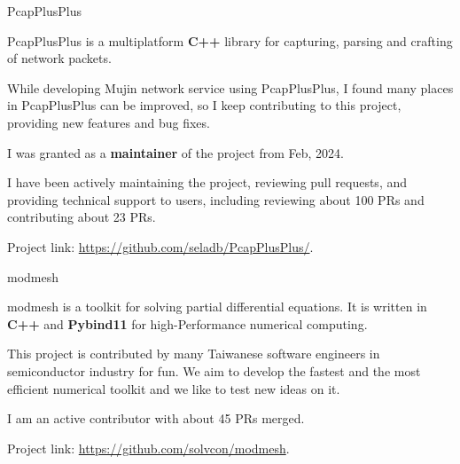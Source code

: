 
\vspace{-2mm}

\begin{cventries}

  \cventry
    {} %
    {PcapPlusPlus} %
    {} %
    {} %
    {
      \vspace{-2mm}
      \begin{cvitems} %
        \item {PcapPlusPlus is a multiplatform \textbf{C++} library for capturing, parsing and crafting of network packets.}
        \item {While developing Mujin network service using PcapPlusPlus, I found many places in PcapPlusPlus can be improved,
        so I keep contributing to this project, providing new features and bug fixes.}
        \item {I was granted as a \textbf{maintainer} of the project from Feb, 2024.}
        \item {I have been actively maintaining the project, reviewing pull requests, and providing technical support to users, including reviewing about 100 PRs and contributing about 23 PRs.}
        \item {Project link: \url{https://github.com/seladb/PcapPlusPlus/}.}
      \end{cvitems}
    }
  \vspace{-2mm}

  \cventry
    {} %
    {modmesh} %
    {} %
    {} %
    {
      \vspace{-2mm}
      \begin{cvitems} %
        \item { modmesh is a toolkit for solving partial differential equations. It is written in \textbf{C++} and \textbf{Pybind11} for high-Performance
        numerical computing.}
        \item { This project is contributed by many Taiwanese software engineers in semiconductor industry for fun. We aim to develop the fastest and the most efficient numerical toolkit and we like to test new ideas on it.}
        \item {I am an active contributor with about 45 PRs merged.}
        \item {Project link: \url{https://github.com/solvcon/modmesh}.}
      \end{cvitems}
    }
    \vspace{-2mm}


\end{cventries}
